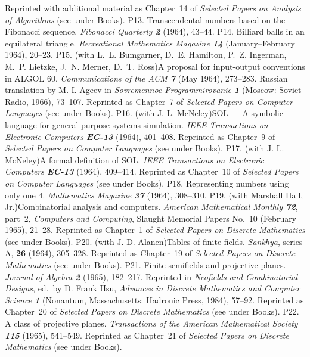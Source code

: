  Reprinted with additional material as Chapter~14 of {\sl Selected Papers
 on Analysis of Algorithms\/} (see under Books).
\p P13.  Transcendental numbers based on the
 Fibonacci sequence.  {\sl Fibonacci Quarterly\/ \bf 2} (1964), 43--44. 
\p P14.  Billiard balls in an equilateral triangle.  {\sl Recreational
 Mathematics Magazine\/ \bf 14} (January--February 1964), 20--23. 
\p P15.  (with L.~L. Bumgarner, D.~E. Hamilton, P.~Z. Ingerman, M.~P. Lietzke,
 J.~N. Merner, D.~T. Ross)\xskip  A proposal for 
 input-output conventions in ALGOL 60.  {\sl Commun\-i\-ca\-tions of
 the ACM\/ \bf 7} (May 1964), 273--283.  Russian translation by M. I. Ageev
 in {\sl Sovremennoe Programmirovanie\/ \bf1} (Moscow: Soviet Radio, 1966),
 73--107.
 Reprinted as Chapter~7 of {\sl Selected Papers on
 Computer Languages\/} (see under Books).
\p P16.  (with J. L. McNeley)\xskip  SOL --- A symbolic language for
 general-purpose systems simulation. 
 {\sl IEEE Transactions on Electronic Computers\/
 \bf EC-13} (1964), 401--408.
 Reprinted as Chapter~9 of {\sl Selected Papers on
 Computer Languages\/} (see under Books).
\p P17.  (with J. L. McNeley)\xskip  A formal definition of SOL\null.
 {\sl IEEE Transactions on Electronic Computers\/ \bf EC-13} (1964), 409--414.
 Reprinted as Chapter~10 of {\sl Selected Papers on
 Computer Languages\/} (see under Books).
\p P18.  Representing numbers using only one 4.  {\sl Mathematics Magazine\/
 \bf 37} (1964), 308--310.  
\p P19.  (with Marshall Hall, Jr.)\xskip  Combinatorial analysis
 and computers.  {\sl American Mathematical Monthly\/ \bf72}, part~2,
 {\sl Computers and Computing}, Slaught Memorial Papers No.~10 (February 1965),
 21--28.
 Reprinted as Chapter~1 of {\sl Selected Papers on
 Discrete Mathematics\/} (see under Books).
\p P20.  (with J. D. Alanen)\xskip  Tables of finite fields. 
 {\sl Sankhy\=a}, series A, {\bf 26} (1964), 305--328.  
 Reprinted as Chapter~19 of {\sl Selected Papers on
 Discrete Mathematics\/} (see under Books).
\p P21.  Finite semifields and projective planes.  {\sl Journal of Algebra\/
 \bf 2} (1965), 182--217. Reprinted in {\sl Neofields and Combinatorial
 Designs}, ed.~by D. Frank Hsu, {\sl Advances in Discrete Mathematics and
 Computer Science\/ \bf 1} (Nonantum, Massachusetts: Hadronic Press, 1984),
 57--92.
 Reprinted as Chapter~20 of {\sl Selected Papers on
 Discrete Mathematics\/} (see under Books).
\p P22.  A class of projective planes.  {\sl Transactions of the American
 Mathematical Society\/ \bf 115} (1965), 541--549.  
 Reprinted as Chapter~21 of {\sl Selected Papers on
 Discrete Mathematics\/} (see under Books).
